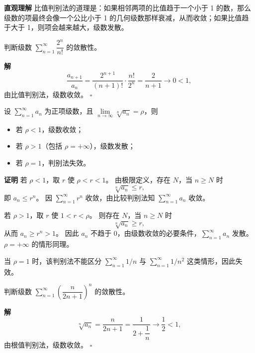 \documentclass[fontset=fandol]{ctexart}
\newenvironment{custom}[1]{\par\noindent\textbf{#1}\quad}{\par\vspace{0.8em}}
\newenvironment{solution}{\par\noindent\textbf{解}\quad}{\hfill$\square$\par\vspace{0.8em}}
\newenvironment{intuition}{\par\noindent\textbf{直观理解}\quad}{\par\vspace{0.8em}}
\begin{document}
\begin{intuition}
比值判别法的道理是：如果相邻两项的比值趋于一个小于 1 的数，那么级数的项最终会像一个公比小于 1 的几何级数那样衰减，从而收敛；如果比值趋于大于 1，则项会越来越大，级数发散。
\end{intuition}

\begin{example}
判断级数 \(\sum\limits_{n = 1}^{  \infty } \dfrac{2^n}{n!}\) 的敛散性。
\end{example}
\begin{solution}
\[
\dfrac{a_{n+1}}{a_n} = \dfrac{2^{n+1}}{(n+1)!} \cdot \dfrac{n!}{2^n} = \dfrac{2}{n+1} \to 0 < 1,
\]
由比值判别法，级数收敛。
\end{solution}

\begin{theorem}
设 \(\sum\limits_{n = 1}^{  \infty } a_n\) 为正项级数，且 \(\lim\limits_{n\to\infty} \sqrt[n]{a_n} = \rho\)，则
\begin{itemize}
\item 若 \(\rho < 1\)，级数收敛；
\item 若 \(\rho > 1\)（包括 \(\rho = +\infty\)），级数发散；
\item 若 \(\rho = 1\)，判别法失效。
\end{itemize}
\end{theorem}

\begin{custom}{证明}
若 $\rho<1$，取 $r$ 使 $\rho<r<1$。 由极限定义，存在 $N$，当 $n\ge N$ 时
\[
\sqrt[n]{a_n}\le r,
\]
即 $a_n\le r^n$。 因 $\sum\limits_{n = 1}^{  \infty } r^n$ 收敛，由比较判别法知 $\sum\limits_{n = 1}^{  \infty } a_n$ 收敛。

若 $\rho>1$，取 $r$ 使 $1<r<\rho$。 则存在 $N$，当 $n\ge N$ 时
\[
\sqrt[n]{a_n}\ge r,
\]
从而 $a_n\ge r^n>1$。 因此 $a_n$ 不趋于 $0$，由级数收敛的必要条件，$\sum\limits_{n = 1}^{  \infty } a_n$ 发散。 $\rho=+\infty$ 的情形同理。

当 $\rho=1$ 时，该判别法不能区分 $\sum\limits_{n = 1}^{  \infty } 1/n$ 与 $\sum\limits_{n = 1}^{  \infty } 1/n^2$ 这类情形，因此失效。
\end{custom}

\begin{example}
判断级数 \(\sum\limits_{n = 1}^{  \infty } \left(\dfrac{n}{2n+1}\right)^n\) 的敛散性。
\end{example}
\begin{solution}
\[
\sqrt[n]{a_n} = \dfrac{n}{2n+1} = \dfrac{1}{2 + \dfrac{1}{n}} \to \dfrac{1}{2} < 1,
\]
由根值判别法，级数收敛。
\end{solution}
\end{document}
